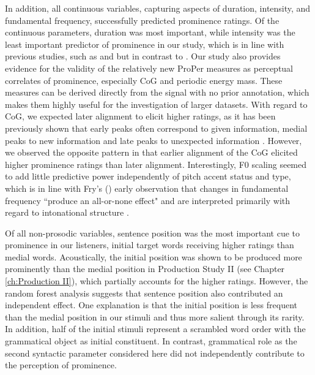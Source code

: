 In addition, all continuous variables, capturing aspects of duration, intensity, and fundamental frequency, successfully predicted prominence ratings. Of the continuous parameters, duration was most important, while intensity was the least important predictor of prominence in our study, which is in line with previous studies, such as \citet{fryDurationIntensityPhysical1955, fryExperimentsPerceptionStress1958} and \citet{turkProcessingDurationIntensity1996} but in contrast to \citet{kochanskiLoudnessPredictsProminence2005}. Our study also provides evidence for the validity of the relatively new ProPer measures \citep{albertModelSonorityBased2023} as perceptual correlates of prominence, especially CoG and periodic energy mass. These measures can be derived directly from the signal with no prior annotation, which makes them highly useful for the investigation of larger datasets. With regard to CoG, we expected later alignment to elicit higher ratings, as it has been previously shown that early peaks often correspond to given information, medial peaks to new information and late peaks to unexpected information \citep[e.g.,][]{niebuhrPerzeptionUndKognitive2007}. However, we observed the opposite pattern in that earlier alignment of the CoG elicited higher prominence ratings than later alignment. Interestingly, F0 scaling seemed to add little predictive power independently of pitch accent status and type, which is in line with Fry's (\citeyear[151]{fryExperimentsPerceptionStress1958}) early observation that changes in fundamental frequency ``produce an all-or-none effect" and are interpreted primarily with regard to intonational structure \citep[see also][]{laddProsodicProminenceLanguages2023}.

Of all non-prosodic variables, sentence position was the most important cue to prominence in our listeners, initial target words receiving higher ratings than medial words. Acoustically, the initial position was shown to be produced more prominently than the medial position in Production Study II (see Chapter \ref{ch:Production II}), which partially accounts for the higher ratings. However, the random forest analysis suggests that sentence position also contributed an independent effect. One explanation is that the initial position is less frequent than the medial position in our stimuli and thus more salient through its rarity. In addition, half of the initial stimuli represent a scrambled word order with the grammatical object as initial constituent. In contrast, grammatical role as the second syntactic parameter considered here did not independently contribute to the perception of prominence.

